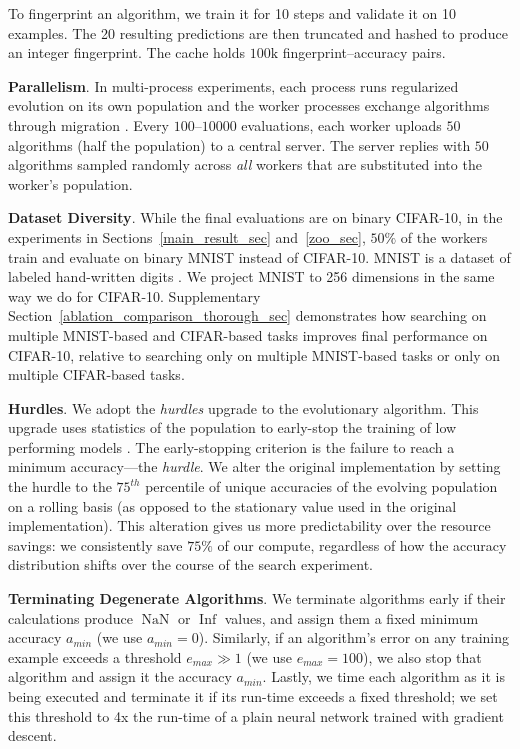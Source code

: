{To fingerprint an algorithm, we train it for 10 steps and validate it on 10 examples. The 20 resulting predictions are then truncated and hashed to produce an integer fingerprint. The cache holds $100\textrm{k}$ fingerprint--accuracy pairs.

\textbf{Parallelism}. In multi-process experiments, each process runs regularized evolution on its own population and the worker processes exchange algorithms through migration \cite{alba2002parallelism}. Every $100$--$10000$ evaluations, each worker uploads $50$ algorithms (half the population) to a central server. The server replies with $50$ algorithms sampled randomly across \textit{all} workers that are substituted into the worker's population.

\textbf{Dataset Diversity}. While the final evaluations are on binary CIFAR-10, in the experiments in Sections~\ref{main_result_sec} and~\ref{zoo_sec}, $50\%$ of the workers train and evaluate on binary MNIST instead of CIFAR-10. MNIST is a dataset of labeled hand-written digits \cite{lecun1998mnist}. We project MNIST to 256 dimensions in the same way we do for CIFAR-10. Supplementary Section~\ref{ablation_comparison_thorough_sec} demonstrates how searching on multiple MNIST-based and CIFAR-based tasks improves final performance on CIFAR-10, relative to searching only on multiple MNIST-based tasks or only on multiple CIFAR-based tasks.

\textbf{Hurdles}. We adopt the \textit{hurdles} upgrade to the evolutionary algorithm. This upgrade uses statistics of the population to early-stop the training of low performing models \cite{So2019TheET}. The early-stopping criterion is the failure to reach a minimum accuracy---the \emph{hurdle}. We alter the original implementation by setting the hurdle to the $75^{th}$ percentile of unique accuracies of the evolving population on a rolling basis (as opposed to the stationary value used in the original implementation). This alteration gives us more predictability over the resource savings: we consistently save $75\%$ of our compute, regardless of how the accuracy distribution shifts over the course of the search experiment.

\textbf{Terminating Degenerate Algorithms}. We terminate algorithms early if their calculations produce $\operatorname{NaN}$ or $\operatorname{Inf}$ values, and assign them a fixed minimum accuracy $a_{min}$ (we use $a_{min}\!\!=\!0$). Similarly, if an algorithm's error on any training example exceeds a threshold $e_{max}\!\!\gg\!\!1$ (we use $e_{max}\!\!=\!\!100$), we also stop that algorithm and assign it the accuracy $a_{min}$. Lastly, we time each algorithm as it is being executed and terminate it if its run-time exceeds a fixed threshold; we set this threshold to 4x the run-time of a plain neural network trained with gradient descent.

}
